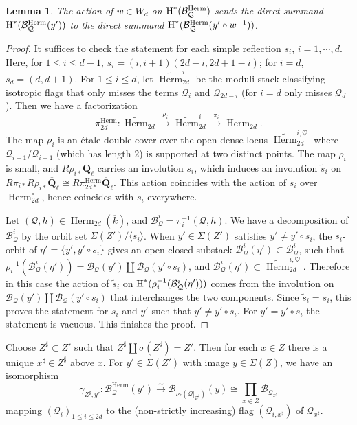 \documentclass[reqno]{amsart}
\numberwithin{equation}{section}
\newcommand{\wt}[1]{\widetilde{#1}}
\newcommand{\Q}{\mathbf{Q}}
\DeclareMathOperator{\Herm}{Herm}
\newcommand\Sig{\Sigma}
\newcommand{\isom}{\stackrel{\sim}{\to}}
\newcommand{\Qlbar}{\overline{\Q}_\ell}
\renewcommand{\j}[1]{\langle{#1}\rangle}
\newcommand{\ov}{\overline}
\newcommand\xr{\xrightarrow}
\renewcommand\c{\circ}
\newcommand{\cohog}[2]{\textup{H}^{#1}({#2})}     %
\newcommand\g\gamma
\newcommand{\s}{\sigma}
\newcommand{\y}{\eta}
\renewcommand{\r}{\rho}
\newcommand\hs{\heartsuit}
\newcommand\sh{\sharp}
\newcommand\cB{\mathcal{B}}
\newcommand\cQ{\mathcal{Q}}
\newtheorem{lemma}[thm]{Lemma}
\theoremstyle{remark}
\numberwithin{equation}{section}
\begin{document}
\begin{lemma}\label{l:permute comp}
The action of $w\in W_{d}$ on $\cohog{*}{\cB^{\Herm}_{\cQ}}$ sends the direct summand $\cohog{*}{\cB^{\Herm}_{\cQ}(y')}$ to the direct summand $\cohog{*}{\cB^{\Herm}_{\cQ}(y'\c w^{-1})}$.
\end{lemma}
\begin{proof}
It suffices to check the statement for each simple reflection $s_{i}$, $i=1,\cdots, d$. Here, for $1\le i\le d-1$,  $s_{i}=(i,i+1)(2d-i,2d+1-i)$; for $i=d$, $s_{d}=(d,d+1)$. For $1\le i\le d$, let $\wt\Herm^{i}_{2d}$ be the moduli stack classifying isotropic flags that only misses the terms $\cQ_{i}$ and $\cQ_{2d-i}$ (for $i=d$ only misses $\cQ_{d}$). Then we have a factorization
\begin{equation*}
\pi^{\Herm}_{2d}: \wt\Herm_{2d}\xr{\r_{i}}\wt\Herm^{i}_{2d}\xr{\pi_{i}}\Herm_{2d}.
\end{equation*}
The map $\r_{i}$ is an \'etale double cover over the open dense locus  $\wt\Herm^{i,\hs}_{2d}$  where $\cQ_{i+1}/\cQ_{i-1}$ (which has length $2$) is supported at two distinct points. The map $\r_{i}$ is small, and $R\r_{i*}\Qlbar$ carries an involution $\wt s_{i}$, which induces an involution $\wt s_{i}$ on $R\pi_{i*}R\r_{i*}\Qlbar\cong R\pi^{\Herm}_{2d*}\Qlbar$. This action coincides with the action of $s_{i}$ over $\Herm_{2d}^{\c}$, hence coincides with $s_{i}$ everywhere. 

Let $(\cQ,h)\in\Herm_{2d}(\ov k)$, and $\cB_{\cQ}^{i}=\pi_{i}^{-1}(\cQ,h)$. We have a decomposition of $\cB_{\cQ}^{i}$ by the orbit set $\Sigma(Z')/\j{s_{i}}$. When $y'\in\Sigma(Z')$ satisfies $y'\ne y'\c s_{i}$, the $s_{i}$-orbit of $\y'=\{y',y'\c s_{i}\}$ gives an open closed substack $\cB^{i}_{\cQ}(\y')\subset \cB_{\cQ}^{i}$, such that $\r^{-1}_{i}(\cB^{i}_{\cQ}(\y'))=\cB_{\cQ}(y')\coprod\cB_{\cQ}(y'\c s_{i})$, and $\cB^{i}_{\cQ}(\y')\subset \wt\Herm^{i,\hs}_{2d}$. Therefore in this case the action of $\wt s_{i}$ on $\cohog{*}{\r^{-1}_{i}(\cB^{i}_{\cQ}(\y'))}$ comes from the involution on $\cB_{\cQ}(y')\coprod\cB_{\cQ}(y'\c s_{i})$ that interchanges the two components. Since $\wt s_{i}=s_{i}$, this proves the statement for $s_{i}$ and $y'$ such that $y'\ne y'\c s_{i}$. For $y'=y'\c s_{i}$ the statement is vacuous. This finishes the proof. 
\end{proof}






Choose $Z^{\sh}\subset Z'$ such that $Z^{\sh}\coprod\s(Z^{\sh})=Z'$. Then for each $x\in Z$ there is a unique $x^{\sh}\in Z^{\sh}$ above $x$. For  $y'\in \Sig(Z')$ with image $y\in \Sig(Z)$, we have an isomorphism
\begin{equation}\label{gZ}
\g_{Z^{\sh}, y'}: \cB^{\Herm}_{\cQ}(y')\isom\cB_{\nu_{*}(\cQ|_{Z^{\sh}})}(y)\cong \prod_{x\in Z}\cB_{\cQ_{x^{\sh}}}
\end{equation}
mapping  $(\cQ_{i})_{1\le i\le 2d}$ to the (non-strictly increasing) flag  $(\cQ_{i,x^{\sh}})$ of $\cQ_{x^{\sh}}$.
\end{document}
